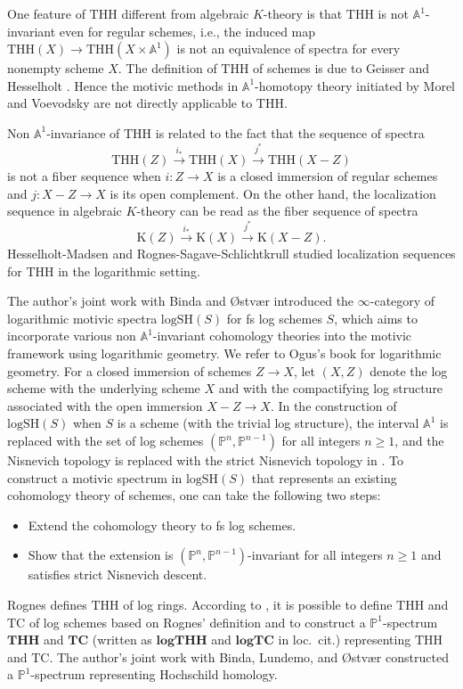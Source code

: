 \documentclass[10pt]{amsart}
\theoremstyle{definition}
\theoremstyle{remark}
\numberwithin{equation}{section}
\newcommand{\A}{\mathbb{A}}
\renewcommand{\P}{\mathbb{P}}
\newcommand{\logSH}{\mathrm{logSH}}
\newcommand{\THH}{\mathrm{THH}}
\newcommand{\TC}{\mathrm{TC}}
\newcommand{\bTHH}{\mathbf{THH}}
\newcommand{\bTC}{\mathbf{TC}}
\newcommand{\Kth}{\mathrm{K}}
\begin{document}
\medskip


One feature of $\THH$ different from algebraic $K$-theory is that $\THH$ is not $\A^1$-invariant even for regular schemes,
i.e.,
the induced map $\THH(X)\to \THH(X\times \A^1)$ is not an equivalence of spectra for every nonempty scheme $X$.
The definition of $\THH$ of schemes is due to Geisser and Hesselholt \cite{GH}.
Hence the motivic methods in $\A^1$-homotopy theory initiated by Morel and Voevodsky \cite{MV} are not directly applicable to $\THH$.

\medskip

Non $\A^1$-invariance of $\THH$ is related to the fact that the sequence of spectra
\[
\THH(Z)\xrightarrow{i_*} \THH(X)
\xrightarrow{j^*} \THH(X-Z)
\]
is not a fiber sequence when $i\colon Z\to X$ is a closed immersion of regular schemes and $j\colon X-Z\to X$ is its open complement.
On the other hand,
the localization sequence in algebraic $K$-theory can be read as the fiber sequence of spectra
\[
\Kth(Z)\xrightarrow{i_*} \Kth(X)\xrightarrow{j^*} \Kth(X-Z).
\]
Hesselholt-Madsen \cite{MR1998478} and Rognes-Sagave-Schlichtkrull \cite{MR3412362} studied localization sequences for $\THH$ in the logarithmic setting.


\medskip

The author's joint work with Binda and {\O}stv{\ae}r \cite{logSH} introduced the $\infty$-category of logarithmic motivic spectra $\logSH(S)$ for fs log schemes $S$,
which aims to incorporate various non $\A^1$-invariant cohomology theories into the motivic framework using logarithmic geometry.
We refer to Ogus's book \cite{Ogu} for logarithmic geometry.
For a closed immersion of schemes $Z\to X$,
let $(X,Z)$ denote the log scheme with the underlying scheme $X$ and with the compactifying log structure associated with the open immersion $X-Z\to X$.
In the construction of $\logSH(S)$ when $S$ is a scheme (with the trivial log structure),
the interval $\A^1$ is replaced with the set of log schemes $(\P^n,\P^{n-1})$ for all integers $n\geq 1$,
and the Nisnevich topology is replaced with the strict Nisnevich topology in \cite{logDM}.
To construct a motivic spectrum in $\logSH(S)$ that represents an existing cohomology theory of schemes,
one can take the following two steps:
\begin{itemize}
\item[Step 1.] Extend the cohomology theory to fs log schemes.
\item[Step 2.] Show that the extension is $(\P^n,\P^{n-1})$-invariant for all integers $n\geq 1$ and satisfies strict Nisnevich descent.
\end{itemize}
Rognes \cite{Rog09} defines $\THH$ of log rings.
According to \cite[\S 8]{logSH},
it is possible to define $\THH$ and $\TC$ of log schemes based on Rognes' definition and to construct a $\P^1$-spectrum $\bTHH$ and $\bTC$ (written as $\mathbf{logTHH}$ and $\mathbf{logTC}$ in loc.\ cit.) representing $\THH$ and $\TC$.
The author's joint work with Binda, Lundemo, and {\O}stv{\ae}r \cite[\S 8]{BLPO} constructed a $\P^1$-spectrum representing Hochschild homology.
\end{document}
